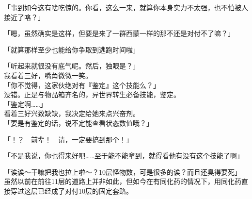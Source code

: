 「事到如今这有啥吃惊的。你看，这么一来，就算你本身实力不太强，也不怕被人接近了咯？」

「嗯，虽然确实是这样，但要是来了一群西蒙一样的那不还是对付不了嘛？」

「就算那样至少也能给你争取到逃跑时间啦」

「听起来就很没有底气呢。然后，独眼是？」\\

我看着三好，嘴角微微一笑。\\

「你不觉得，这家伙绝对有『鉴定』这个技能么？」\\

没错。正是与物品箱齐名的，异世界转生必备技能，鉴定。\\

「鉴定啊……」\\

看着三好兴致缺缺，我决定给她来点兴奋剂。\\

「要是有鉴定的话，说不定能查看状态数值哦？」

「！？　前辈！　请，一定要搞到那个！」

「不是我说，你也得来好吧……至于能不能拿到，就得看他有没有这个技能了啊」

「诶诶～干嘛把我也拉上啦～？10层怪物数，可是很多的诶？而且还臭得要死」\\

虽然以前在前往11层的道路上并非如此，但如今在有同化药的情况下，用同化药直接穿过这层已经成了对付10层的固定套路。

